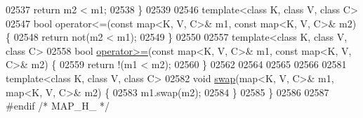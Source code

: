 \begin{DoxyCode}
02537     \textcolor{keywordflow}{return} m2 < m1;
02538 \}
02539 
02546 \textcolor{keyword}{template}<\textcolor{keyword}{class} K, \textcolor{keyword}{class} V, \textcolor{keyword}{class} C>
02547 \textcolor{keywordtype}{bool} operator<=(const map<K, V, C>& m1, \textcolor{keyword}{const} map<K, V, C>& m2) \{
02548     \textcolor{keywordflow}{return} not(m2 < m1);
02549 \}
02550 
02557 \textcolor{keyword}{template}<\textcolor{keyword}{class} K, \textcolor{keyword}{class} V, \textcolor{keyword}{class} C>
02558 \textcolor{keywordtype}{bool} \hyperlink{classaed2_1_1map_a093a6d1a055339c5fc6297a1d47a9159_a093a6d1a055339c5fc6297a1d47a9159}{operator>=}(\textcolor{keyword}{const} map<K, V, C>& m1, \textcolor{keyword}{const} map<K, V, C>& m2) \{
02559     \textcolor{keywordflow}{return} !(m1 < m2);
02560 \}
02562 
02564 
02565 
02566 
02581 \textcolor{keyword}{template}<\textcolor{keyword}{class} K, \textcolor{keyword}{class} V, \textcolor{keyword}{class} C>
02582 \textcolor{keywordtype}{void} \hyperlink{classaed2_1_1map_a119cb2938bbc11c25ebd4fb824782a72_a119cb2938bbc11c25ebd4fb824782a72}{swap}(map<K, V, C>& m1, map<K, V, C>& m2) \{
02583     m1.swap(m2);
02584 \}
02585 \}
02586 
02587 \textcolor{preprocessor}{#endif }\textcolor{comment}{/* MAP\_H\_ */}
\end{DoxyCode}
